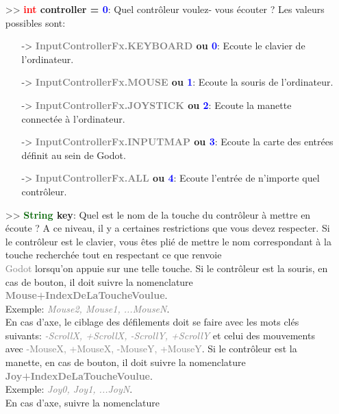\documentclass[a4paper, 11pt]{article}
\begin{document}
	\begin{itemize}
		\item[>> \textbf{\textcolor{red}{int} controller = \textcolor{blue}{0}}:] Quel contrôleur voulez-
		vous écouter ? Les valeurs possibles sont:
		\begin{itemize}
			\item[-> \textbf{\textcolor{gray}{InputControllerFx.KEYBOARD} ou \textcolor{blue}{0}}:] Ecoute 
			le clavier de l'ordinateur.
			\item[-> \textbf{\textcolor{gray}{InputControllerFx.MOUSE} ou \textcolor{blue}{1}}:] Ecoute la 
			souris de l'ordinateur.
			\item[-> \textbf{\textcolor{gray}{InputControllerFx.JOYSTICK} ou \textcolor{blue}{2}}:] Ecoute 
			la manette connectée à l'ordinateur.
			\item[-> \textbf{\textcolor{gray}{InputControllerFx.INPUTMAP} ou \textcolor{blue}{3}}:] Ecoute 
			la carte des entrées définit au sein de Godot.
			\item[-> \textbf{\textcolor{gray}{InputControllerFx.ALL} ou \textcolor{blue}{4}}:] Ecoute 
			l'entrée de n'importe quel contrôleur.\\
		\end{itemize}
		\item[>> \textbf{\textcolor{darkgreen}{String} \hypertarget{key}{key}}:] Quel est le nom de la 
		touche du contrôleur à mettre en écoute ? A ce niveau, il y a certaines restrictions que vous devez 
		respecter. Si le contrôleur est le clavier, vous êtes plié de mettre le nom correspondant à la 
		touche recherchée tout en respectant ce que renvoie \textcolor{gray}{\\Godot} lorsqu'on appuie sur 
		une telle touche. Si le contrôleur est la souris, en cas de bouton, il doit suivre la nomenclature 
		\textcolor{gray}{\textbf{Mouse+IndexDeLaToucheVoulue}}. \\Exemple: \textcolor{gray}{\textit{Mouse2, 
		Mouse1, ...MouseN}}. \\En cas d'axe, le ciblage des défilements doit se faire avec les mots clés 
		suivants: \textcolor{gray}{\textit{-ScrollX, +ScrollX, -ScrollY, +ScrollY}} et celui des mouvements
		avec \textcolor{gray}{-MouseX, +MouseX, -MouseY, +MouseY}. Si le contrôleur est la manette, en cas 
		de bouton, il doit suivre la nomenclature \textcolor{gray}{\textbf{\\Joy+IndexDeLaToucheVoulue}}.\\
		Exemple: \textcolor{gray}{\textit{Joy0, Joy1, ...JoyN}}. \\En cas d'axe, suivre la nomenclature 

\end{itemize}
\end{document}
